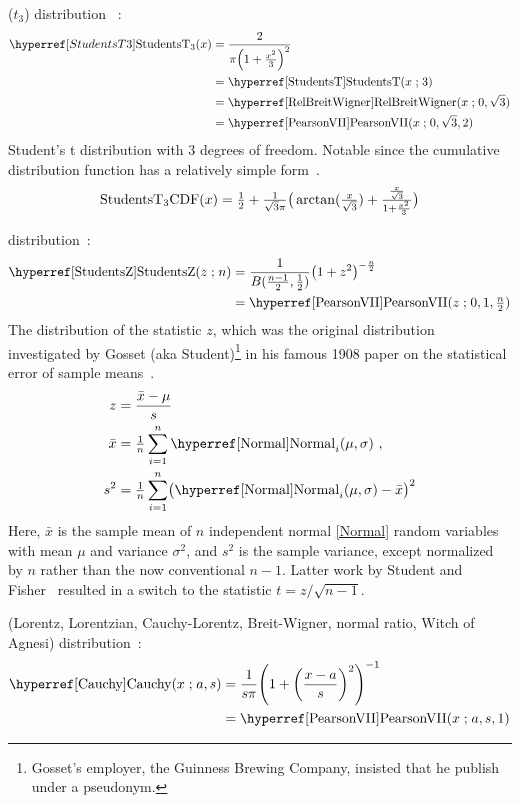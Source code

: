  ($t_3$) distribution~\cite{Devroye1986} :
\begin{align}
\label{StudentsT3}
\StudentsTTT(x)
&= \frac{2}{\pi \Left( 1 + \tfrac{x^2}{3} \Right)^{2} } \checked
\\ \notag 
& = \opr{StudentsT}(x\given 3) \checked
\\ \notag
& = \opr{RelBreitWigner}(x\given 0, \sqrt{3})\checked 
\\ \notag 
&= \opr{PearsonVII}(x\given 0,\sqrt{3},2) \checked
\end{align}
Student's t distribution with 3 degrees of freedom. Notable since the cumulative distribution function has a relatively simple form~\cite[p37]{Devroye1986}.
\[
\notag 
\op{StudentsT_3 CDF} (x) = \half + \sfrac{1}{\sqrt{3}\pi} \bigr( \arctan( \sfrac{x}{\sqrt{3}}) + \sfrac{\sfrac{x}{\sqrt{3}}}{1+\sfrac{x^2}{3}} \bigl) \checked
\]



  distribution~\cite{Student1908,Hanley2008}:
\begin{align}
\label{StudentsZ}
\opr{StudentsZ}(z\given n) &= \frac{1}{B(\tfrac{n-1}{2}, \tfrac{1}{2})}  \Left( 1 + z^2 \Right)^{-\frac{n}{2} } \checked \\
&= \opr{PearsonVII}(z\given 0,1,\tfrac{n}{2}) \notag \checked
\end{align}
The distribution of the statistic $z$, which was the original distribution investigated by Gosset (aka Student)\footnote{Gosset's employer, the Guinness Brewing Company, insisted that he publish under a pseudonym.} in his famous 1908 paper
 on the statistical error of sample means~\cite{Student1908}.
\begin{align*}
	z &= \frac {\bar{x} - \mu}{s}  \checked \\ 
	\bar{x} &= \tfrac{1}{n} \sum_{i=1}^{n} \opr{Normal}_i (\mu,\sigma) \ ,  \checked\\
	s^2 &= \tfrac{1}{n} \sum_{i=1}^{n} \bigl( \opr{Normal}_i (\mu,\sigma) - \bar{x} \bigr)^2 \checked
\end{align*}
Here, $\bar{x}$ is the sample mean of $n$ independent normal \eqref{Normal} random variables with mean $\mu$ and variance  $\sigma^2$, and $s^2$ is the sample variance, except normalized by $n$ rather than the now conventional $n-1$. Latter work by Student and Fisher~\cite{Fisher1925b} resulted in a switch to the statistic $t= z/\sqrt{n-1}$.


 (Lorentz, Lorentzian, Cauchy-Lorentz,  Breit-Wigner, normal ratio, Witch of Agnesi) distribution~\cite{Poisson1827,Cauchy1853,Johnson1995}: 
%
\begin{align}
\label{Cauchy}
\opr{Cauchy}(x\given a,s) &= \frac{1}{s \pi} \Left( 1 +\Left( \frac{x-a}{s}\Right)^2 \Right)^{-1}		\checked
\\  
&= \opr{PearsonVII}(x\given a,s,1)												\checked
\notag 
\end{align}

